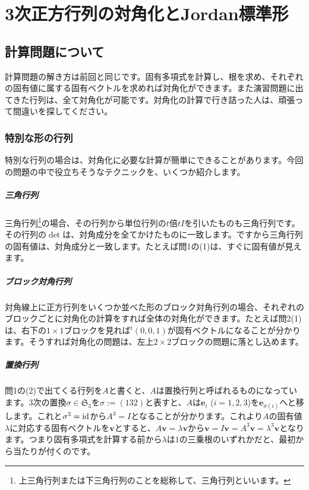 \chapter{3次正方行列の対角化とJordan標準形}


\section{計算問題について}

計算問題の解き方は前回と同じです。固有多項式を計算し、根を求め、それぞれの固有値に属する固有ベクトルを求めれば対角化ができます。また演習問題に出てきた行列は、全て対角化が可能です。対角化の計算で行き詰った人は、頑張って間違いを探してください。

\subsection{特別な形の行列}

特別な行列の場合は、対角化に必要な計算が簡単にできることがあります。今回の問題の中で役立ちそうなテクニックを、いくつか紹介します。

\paragraph{三角行列}

三角行列\footnote{上三角行列または下三角行列のことを総称して、三角行列といいます。}の場合、その行列から単位行列の$t$倍$t I$を引いたものも三角行列です。その行列の$\det$は、対角成分を全てかけたものに一致します。ですから三角行列の固有値は、対角成分と一致します。たとえば問1の(1)は、すぐに固有値が見えます。

\paragraph{ブロック対角行列}

対角線上に正方行列をいくつか並べた形のブロック対角行列の場合、それぞれのブロックごとに対角化の計算をすれば全体の対角化ができます。たとえば問2(1)は、右下の$1 \times 1$ブロックを見れば${}^t(0, 0, 1)$が固有ベクトルになることが分かります。そうすれば対角化の問題は、左上$2 \times 2$ブロックの問題に落とし込めます。

\paragraph{置換行列}

問1の(2)で出てくる行列を$A$と書くと、$A$は置換行列と呼ばれるものになっています。$3$次の置換$\sigma \in \mathfrak{S}_3$を$\sigma := (132)$と表すと、$A$は$\bm{e}_i$ ($i = 1, 2, 3$)を$\bm{e}_{\sigma(i)}$へと移します。これと$\sigma^3 = \operatorname{id}$から$A^3 = I$となることが分かります。これより$A$の固有値$\lambda$に対応する固有ベクトルを$\bm{v}$とすると、$A\bm{v} = \lambda\bm{v}$から$\bm{v} = I\bm{v} = A^3 \bm{v} = \lambda^3 \bm{v}$となります。つまり固有多項式を計算する前から$\lambda$は$1$の三乗根のいずれかだと、最初から当たりが付くのです。

